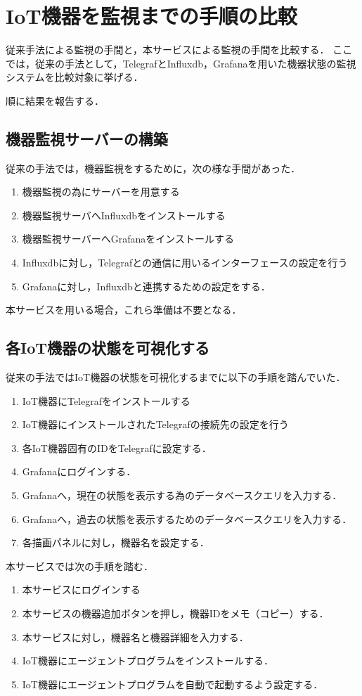 \section{IoT機器を監視までの手順の比較}
従来手法による監視の手間と，本サービスによる監視の手間を比較する．
ここでは，従来の手法として，TelegrafとInfluxdb，Grafanaを用いた機器状態の監視システムを比較対象に挙げる．

順に結果を報告する．
\subsection{機器監視サーバーの構築}
従来の手法では，機器監視をするために，次の様な手間があった．
\begin{enumerate}
\item 機器監視の為にサーバーを用意する
\item 機器監視サーバへInfluxdbをインストールする
\item 機器監視サーバーへGrafanaをインストールする
\item Influxdbに対し，Telegrafとの通信に用いるインターフェースの設定を行う
\item Grafanaに対し，Influxdbと連携するための設定をする．
\end{enumerate}

本サービスを用いる場合，これら準備は不要となる．

\subsection{各IoT機器の状態を可視化する}
従来の手法ではIoT機器の状態を可視化するまでに以下の手順を踏んでいた．
\begin{enumerate}
\item IoT機器にTelegrafをインストールする
\item IoT機器にインストールされたTelegrafの接続先の設定を行う
\item 各IoT機器固有のIDをTelegrafに設定する．
\item Grafanaにログインする．
\item Grafanaへ，現在の状態を表示する為のデータベースクエリを入力する．
\item Grafanaへ，過去の状態を表示するためのデータベースクエリを入力する．
\item 各描画パネルに対し，機器名を設定する．
\end{enumerate}

本サービスでは次の手順を踏む．
\begin{enumerate}
\item 本サービスにログインする
\item 本サービスの機器追加ボタンを押し，機器IDをメモ（コピー）する．
\item 本サービスに対し，機器名と機器詳細を入力する．
\item IoT機器にエージェントプログラムをインストールする．
\item IoT機器にエージェントプログラムを自動で起動するよう設定する．
\end{enumerate}

